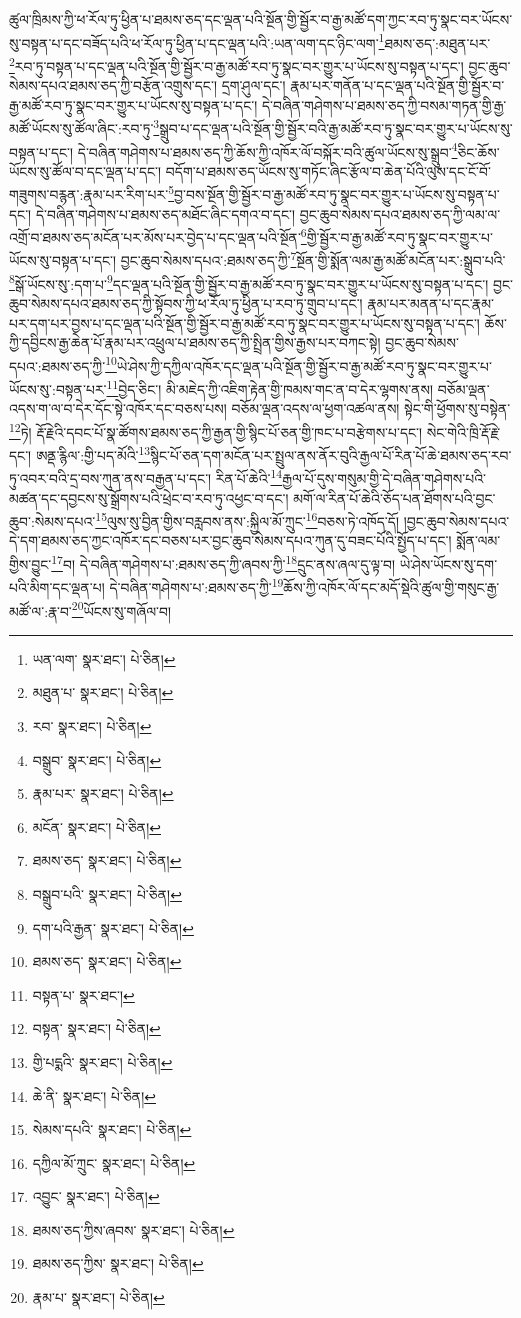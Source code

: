 ཚུལ་ཁྲིམས་ཀྱི་ཕ་རོལ་ཏུ་ཕྱིན་པ་ཐམས་ཅད་དང་ལྡན་པའི་སྔོན་གྱི་སྦྱོར་བ་རྒྱ་མཚོ་དག་ཀྱང་རབ་ཏུ་སྣང་བར་ཡོངས་སུ་བསྟན་པ་དང་བཟོད་པའི་ཕ་རོལ་ཏུ་ཕྱིན་པ་དང་ལྡན་པའི་:ཡན་ལག་དང་ཉིང་ལག་\footnote{ཡན་ལག་  སྣར་ཐང་།  པེ་ཅིན། }ཐམས་ཅད་:མཐུན་པར་\footnote{མཐུན་པ་  སྣར་ཐང་།  པེ་ཅིན། }རབ་ཏུ་བསྟན་པ་དང་ལྡན་པའི་སྔོན་གྱི་སྦྱོར་བ་རྒྱ་མཚོ་རབ་ཏུ་སྣང་བར་གྱུར་པ་ཡོངས་སུ་བསྟན་པ་དང་། བྱང་ཆུབ་སེམས་དཔའ་ཐམས་ཅད་ཀྱི་བརྩོན་འགྲུས་དང་། དྲག་ཤུལ་དང་། རྣམ་པར་གནོན་པ་དང་ལྡན་པའི་སྔོན་གྱི་སྦྱོར་བ་རྒྱ་མཚོ་རབ་ཏུ་སྣང་བར་གྱུར་པ་ཡོངས་སུ་བསྟན་པ་དང་། དེ་བཞིན་གཤེགས་པ་ཐམས་ཅད་ཀྱི་བསམ་གཏན་གྱི་རྒྱ་མཚོ་ཡོངས་སུ་ཚོལ་ཞིང་:རབ་ཏུ་\footnote{རབ་  སྣར་ཐང་།  པེ་ཅིན། }སྒྲུབ་པ་དང་ལྡན་པའི་སྔོན་གྱི་སྦྱོར་བའི་རྒྱ་མཚོ་རབ་ཏུ་སྣང་བར་གྱུར་པ་ཡོངས་སུ་བསྟན་པ་དང་། དེ་བཞིན་གཤེགས་པ་ཐམས་ཅད་ཀྱི་ཆོས་ཀྱི་འཁོར་ལོ་བསྐོར་བའི་ཚུལ་ཡོངས་སུ་སྒྲུབ་\footnote{བསྒྲུབ་  སྣར་ཐང་།  པེ་ཅིན། }ཅིང་ཆོས་ཡོངས་སུ་ཚོལ་བ་དང་ལྡན་པ་དང་། བདོག་པ་ཐམས་ཅད་ཡོངས་སུ་གཏོང་ཞིང་རྩོལ་བ་ཆེན་པོའི་ལུས་དང་ངོ་བོ་གཟུགས་བརྙན་:རྣམ་པར་རིག་པར་\footnote{རྣམ་པར་  སྣར་ཐང་།  པེ་ཅིན། }བྱ་བས་སྔོན་གྱི་སྦྱོར་བ་རྒྱ་མཚོ་རབ་ཏུ་སྣང་བར་གྱུར་པ་ཡོངས་སུ་བསྟན་པ་དང་། དེ་བཞིན་གཤེགས་པ་ཐམས་ཅད་མཐོང་ཞིང་དགའ་བ་དང་། བྱང་ཆུབ་སེམས་དཔའ་ཐམས་ཅད་ཀྱི་ལམ་ལ་འགྲོ་བ་ཐམས་ཅད་མངོན་པར་མོས་པར་བྱེད་པ་དང་ལྡན་པའི་སྔོན་\footnote{མངོན་  སྣར་ཐང་།  པེ་ཅིན། }གྱི་སྦྱོར་བ་རྒྱ་མཚོ་རབ་ཏུ་སྣང་བར་གྱུར་པ་ཡོངས་སུ་བསྟན་པ་དང་། བྱང་ཆུབ་སེམས་དཔའ་:ཐམས་ཅད་ཀྱི་\footnote{ཐམས་ཅད་  སྣར་ཐང་།  པེ་ཅིན། }སྔོན་གྱི་སྨོན་ལམ་རྒྱ་མཚོ་མངོན་པར་:སྒྲུབ་པའི་\footnote{བསྒྲུབ་པའི་  སྣར་ཐང་།  པེ་ཅིན། }སྒོ་ཡོངས་སུ་:དག་པ་\footnote{དག་པའི་རྒྱན་  སྣར་ཐང་།  པེ་ཅིན། }དང་ལྡན་པའི་སྔོན་གྱི་སྦྱོར་བ་རྒྱ་མཚོ་རབ་ཏུ་སྣང་བར་གྱུར་པ་ཡོངས་སུ་བསྟན་པ་དང་། བྱང་ཆུབ་སེམས་དཔའ་ཐམས་ཅད་ཀྱི་སྟོབས་ཀྱི་ཕ་རོལ་ཏུ་ཕྱིན་པ་རབ་ཏུ་གྲུབ་པ་དང་། རྣམ་པར་མནན་པ་དང་རྣམ་པར་དག་པར་བྱས་པ་དང་ལྡན་པའི་སྔོན་གྱི་སྦྱོར་བ་རྒྱ་མཚོ་རབ་ཏུ་སྣང་བར་གྱུར་པ་ཡོངས་སུ་བསྟན་པ་དང་། ཆོས་ཀྱི་དབྱིངས་རྒྱ་ཆེན་པོ་རྣམ་པར་འཕྲུལ་པ་ཐམས་ཅད་ཀྱི་སྤྲིན་གྱིས་རྒྱས་པར་བཀང་སྟེ། བྱང་ཆུབ་སེམས་དཔའ་:ཐམས་ཅད་ཀྱི་\footnote{ཐམས་ཅད་  སྣར་ཐང་།  པེ་ཅིན། }ཡེ་ཤེས་ཀྱི་དཀྱིལ་འཁོར་དང་ལྡན་པའི་སྔོན་གྱི་སྦྱོར་བ་རྒྱ་མཚོ་རབ་ཏུ་སྣང་བར་གྱུར་པ་ཡོངས་སུ་:བསྟན་པར་\footnote{བསྟན་པ་  སྣར་ཐང་། }བྱེད་ཅིང་། མི་མཇེད་ཀྱི་འཇིག་རྟེན་གྱི་ཁམས་གང་ན་བ་དེར་ལྷགས་ནས། བཅོམ་ལྡན་འདས་ག་ལ་བ་དེར་དོང་སྟེ་འཁོར་དང་བཅས་པས། བཅོམ་ལྡན་འདས་ལ་ཕྱག་འཚལ་ནས། སྟེང་གི་ཕྱོགས་སུ་བསྟེན་\footnote{བསྟན་  སྣར་ཐང་།  པེ་ཅིན། }ཏེ། རྡོ་རྗེའི་དབང་པོ་སྣ་ཚོགས་ཐམས་ཅད་ཀྱི་རྒྱན་གྱི་སྙིང་པོ་ཅན་གྱི་ཁང་པ་བརྩེགས་པ་དང་། སེང་གེའི་ཁྲི་རྡོ་རྗེ་དང་། ཨནྡ་རྙིལ་:གྱི་པད་མོའི་\footnote{གྱི་པདྨའི་  སྣར་ཐང་།  པེ་ཅིན། }སྙིང་པོ་ཅན་དག་མངོན་པར་སྤྲུལ་ནས་ནོར་བུའི་རྒྱལ་པོ་རིན་པོ་ཆེ་ཐམས་ཅད་རབ་ཏུ་འབར་བའི་དྲ་བས་ཀུན་ནས་བརྒྱན་པ་དང་། རིན་པོ་ཆེའི་\footnote{ཆེ་ནི་  སྣར་ཐང་།  པེ་ཅིན། }རྒྱལ་པོ་དུས་གསུམ་གྱི་དེ་བཞིན་གཤེགས་པའི་མཚན་དང་དབྱངས་སུ་སྒྲོགས་པའི་ཕྲེང་བ་རབ་ཏུ་འཕྱང་བ་དང་། མགོ་ལ་རིན་པོ་ཆེའི་ཅོད་པན་ཐོགས་པའི་བྱང་ཆུབ་:སེམས་དཔའ་\footnote{སེམས་དཔའི་  སྣར་ཐང་།  པེ་ཅིན། }ལུས་སུ་བྱིན་གྱིས་བརླབས་ནས་:སྐྱིལ་མོ་ཀྲུང་\footnote{དཀྱིལ་མོ་ཀྲུང་  སྣར་ཐང་།  པེ་ཅིན། }བཅས་ཏེ་འཁོད་དོ། །བྱང་ཆུབ་སེམས་དཔའ་དེ་དག་ཐམས་ཅད་ཀྱང་འཁོར་དང་བཅས་པར་བྱང་ཆུབ་སེམས་དཔའ་ཀུན་དུ་བཟང་པོའི་སྤྱོད་པ་དང་། སྨོན་ལམ་གྱིས་བྱུང་\footnote{འབྱུང་  སྣར་ཐང་།  པེ་ཅིན། }བ། དེ་བཞིན་གཤེགས་པ་:ཐམས་ཅད་ཀྱི་ཞབས་ཀྱི་\footnote{ཐམས་ཅད་ཀྱིས་ཞབས་  སྣར་ཐང་།  པེ་ཅིན། }དྲུང་ནས་ཞལ་དུ་ལྟ་བ། ཡེ་ཤེས་ཡོངས་སུ་དག་པའི་མིག་དང་ལྡན་པ། དེ་བཞིན་གཤེགས་པ་:ཐམས་ཅད་ཀྱི་\footnote{ཐམས་ཅད་ཀྱིས་  སྣར་ཐང་།  པེ་ཅིན། }ཆོས་ཀྱི་འཁོར་ལོ་དང་མདོ་སྡེའི་ཚུལ་གྱི་གསུང་རྒྱ་མཚོ་ལ་:རྣ་བ་\footnote{རྣམ་པ་  སྣར་ཐང་།  པེ་ཅིན། }ཡོངས་སུ་གཞོལ་བ། 